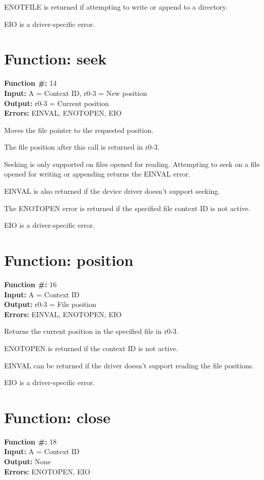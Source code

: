 ENOTFILE is returned if attempting to write or append
to a directory.

EIO is a driver-specific error.


\section{Function: seek}

\textbf{Function \#:} 14 \\
\textbf{Input:} A = Context ID, r0-3 = New position \\
\textbf{Output:} r0-3 = Current position \\
\textbf{Errors:} EINVAL, ENOTOPEN, EIO

Moves the file pointer to the requested position.

The file position after this call is returned in r0-3.

Seeking is only supported on files opened for reading. Attempting to 
seek on a file opened for writing or appending returns 
the EINVAL error.

EINVAL is also returned if the device driver doesn't support
seeking.

The ENOTOPEN error is returned if the specified file context ID is
not active.

EIO is a driver-specific error.


\section{Function: position}

\textbf{Function \#:} 16 \\
\textbf{Input:} A = Context ID \\
\textbf{Output:} r0-3 = File position \\
\textbf{Errors:} EINVAL, ENOTOPEN, EIO

Returns the current position in the specified file in r0-3.

ENOTOPEN is returned if the context ID is not active.

EINVAL can be returned if the driver doesn't support
reading the file positions.

EIO is a driver-specific error.


\section{Function: close}

\textbf{Function \#:} 18 \\
\textbf{Input:} A = Context ID \\
\textbf{Output:} None \\
\textbf{Errors:} ENOTOPEN, EIO


